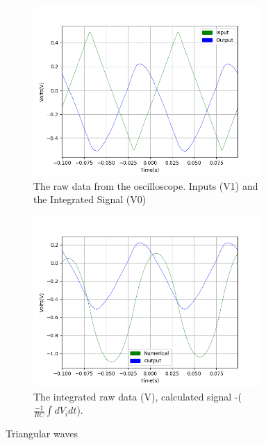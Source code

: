 \begin{figure}[h!]
\centering
\begin{subfigure}[t]{.475\textwidth}
  \centering
  \includegraphics[width=0.95\textwidth, height=0.20\textheight]{figures/Intergration/scope_22raw.png}
  \caption{The raw data from the oscilloscope. Inputs (V1) and the Integrated Signal (V0)}
 \label{fig:int_1_og_data}
\end{subfigure}\hfill
\begin{subfigure}[t]{.475\textwidth}
  \centering
  \includegraphics[width=0.95\textwidth, height=0.20\textheight]{figures/Intergration/scope_22.png}
  \caption{The integrated raw data (V), calculated signal -($\frac{-1}{RC}\int dV_i dt$).}
\label{fig:sum_1_calc_data}
\end{subfigure}
\caption{Triangular waves}
\label{fig:int_1}

\end{figure}
